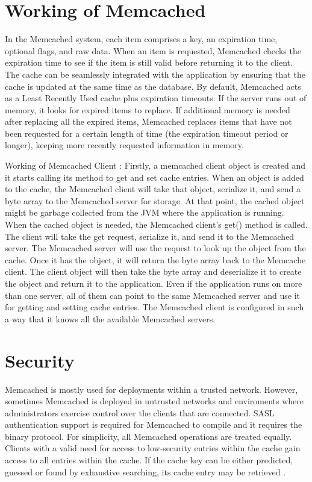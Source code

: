 \documentclass[9pt,twocolumn,twoside]{../../styles/osajnl}
\begin{document}
\section{Working of Memcached}
In the Memcached system, each item comprises a key, an expiration
time, optional flags, and raw data. When an item is requested,
Memcached checks the expiration time to see if the item is still valid
before returning it to the client. The cache can be seamlessly
integrated with the application by ensuring that the cache is updated
at the same time as the database.  By default, Memcached acts as a
Least Recently Used cache plus expiration timeouts.  If the server
runs out of memory, it looks for expired items to replace. If
additional memory is needed after replacing all the expired items,
Memcached replaces items that have not been requested for a certain
length of time (the expiration timeout period or longer), keeping more
recently requested information in memory.

Working of Memcached Client \cite{www-memcached-java}: Firstly, a
memcached client object is created and it starts calling its method to
get and set cache entries. When an object is added to the cache, the
Memcached client will take that object, serialize it, and send a byte
array to the Memcached server for storage. At that point, the cached
object might be garbage collected from the JVM where the application
is running. When the cached object is needed, the Memcached client's
get() method is called.  The client will take the get request,
serialize it, and send it to the Memcached server. The Memcached
server will use the request to look up the object from the cache. Once
it has the object, it will return the byte array back to the Memcache
client. The client object will then take the byte array and
deserialize it to create the object and return it to the
application. Even if the application runs on more than one server, all
of them can point to the same Memcached server and use it for getting
and setting cache entries. The Memcached client is configured in such
a way that it knows all the available Memcached servers.

\section{Security}
Memcached is mostly used for deployments within a trusted
network. However, sometimes Memcached is deployed in untrusted
networks and enviroments where administrators exercise control over
the clients that are connected. SASL authentication support is
required for Memcached to compile and it requires the binary
protocol. For simplicity, all Memcached operations are treated
equally. Clients with a valid need for access to low-security entries
within the cache gain access to all entries within the cache. If the
cache key can be either predicted, guessed or found by exhaustive
searching, its cache entry may be retrieved
\cite{www-memcached-wikipedia}.
\end{document}
